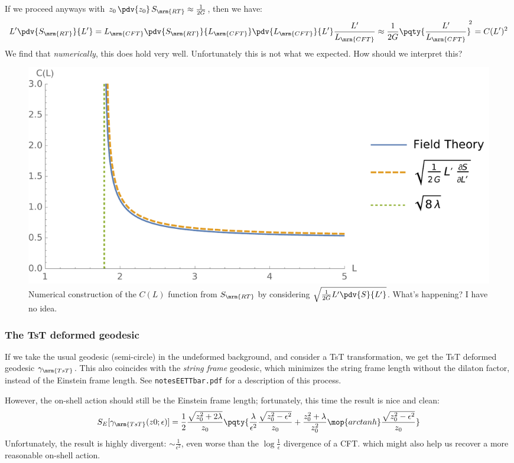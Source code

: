 \documentclass[a4paper
	,10pt
]{article}
\begin{document}
\begin{itemize}
\pagebreak[3]
	
	If we proceed anyways with $
		z_0\,\pdv{z_0}\,S_\mrm{RT}
		\approx \frac{1}{2G}
	$, then we have:
	\begin{equation}
		L' \pdv{S_\mrm{RT}}{L'}
		= L_\mrm{CFT} \pdv{S_\mrm{RT}}{L_\mrm{CFT}}
			\pdv{L_\mrm{CFT}}{L'}
			\frac{L'}{L_\mrm{CFT}}
		\approx \frac{1}{2G}
			\pqty{\frac{L'}{L_\mrm{CFT}}}^{\!\!2}
		= C(L')^2
	\end{equation}
	We find that \textit{numerically}, this does hold very well. Unfortunately this is not what we expected. How should we interpret this?
	\end{itemize}
	
	\begin{figure}[!ht]
	\centering
	\includegraphics[width=.7\linewidth]{img/cFunctionGame.pdf}
	\caption[Numerical construction of the $C(L)$ function]{%
		Numerical construction of the $C(L)$ function from $S_\mrm{RT}$ by considering $
			\sqrt{
				\frac{1}{2G}
				L' \pdv{S}{L'}
			}
		$. What's happening? I have no idea. 
	}
	\end{figure}
\subsubsection{The TsT deformed geodesic}
	If we take the usual geodesic (semi-circle) in the undeformed background, and consider a TsT transformation, we get the TsT deformed geodesic $\gamma_\mrm{TsT}$. This also coincides with the \textit{string frame} geodesic, which minimizes the string frame length without the dilaton factor, instead of the Einstein frame length. See \texttt{notesEETTbar.pdf} for a description of this process. 
	
	However, the on-shell action should still be the Einstein frame length; fortunately, this time the result is nice and clean:
	\begin{equation}
		S_E[\gamma_\mrm{TsT}(z0;\epsilon)]
		= \frac{1}{2}
			\frac{\sqrt{z_0^2 + 2\lambda}}{z_0}
			\pqty{
				\frac{\lambda}{\epsilon^2}
				\frac{\sqrt{z_0^2 - \epsilon^2}}{z_0}
				+ \frac{z_0^2 + \lambda}{z_0^2}
				\mop{arctanh}
					\frac{\sqrt{z_0^2 - \epsilon^2}}{z_0}
			}
	\end{equation}
	Unfortunately, the result is highly divergent: $\sim \frac{1}{\epsilon^2}$, even worse than the $\log \frac{1}{\epsilon}$ divergence of a CFT. 
	 which might also help us recover a more reasonable on-shell action.
	
\vspace{1.2\baselineskip}
\pagebreak[4]
\raggedright
\printbibliography[%
	,heading = bibintoc
]
\end{document}
